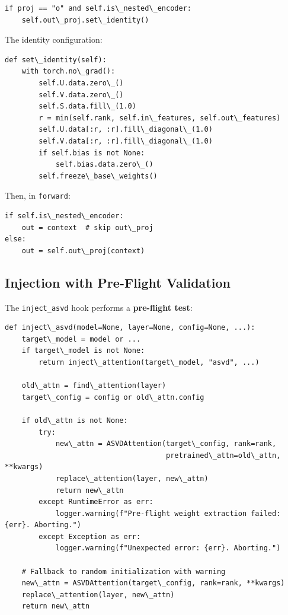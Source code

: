\begin{lstlisting}
if proj == "o" and self.is\_nested\_encoder:
    self.out\_proj.set\_identity()
\end{lstlisting}

The identity configuration:

\begin{lstlisting}
def set\_identity(self):
    with torch.no\_grad():
        self.U.data.zero\_()
        self.V.data.zero\_()
        self.S.data.fill\_(1.0)
        r = min(self.rank, self.in\_features, self.out\_features)
        self.U.data[:r, :r].fill\_diagonal\_(1.0)
        self.V.data[:r, :r].fill\_diagonal\_(1.0)
        if self.bias is not None:
            self.bias.data.zero\_()
        self.freeze\_base\_weights()
\end{lstlisting}

Then, in \texttt{forward}:

\begin{lstlisting}
if self.is\_nested\_encoder:
    out = context  # skip out\_proj
else:
    out = self.out\_proj(context)
\end{lstlisting}

\subsection{Injection with Pre-Flight Validation}

The \texttt{inject\_asvd} hook performs a \textbf{pre-flight test}:

\begin{lstlisting}
def inject\_asvd(model=None, layer=None, config=None, ...):
    target\_model = model or ...
    if target\_model is not None:
        return inject\_attention(target\_model, "asvd", ...)
    
    old\_attn = find\_attention(layer)
    target\_config = config or old\_attn.config
    
    if old\_attn is not None:
        try:
            new\_attn = ASVDAttention(target\_config, rank=rank,
                                      pretrained\_attn=old\_attn, **kwargs)
            replace\_attention(layer, new\_attn)
            return new\_attn
        except RuntimeError as err:
            logger.warning(f"Pre-flight weight extraction failed: {err}. Aborting.")
        except Exception as err:
            logger.warning(f"Unexpected error: {err}. Aborting.")
    
    # Fallback to random initialization with warning
    new\_attn = ASVDAttention(target\_config, rank=rank, **kwargs)
    replace\_attention(layer, new\_attn)
    return new\_attn
\end{lstlisting}

